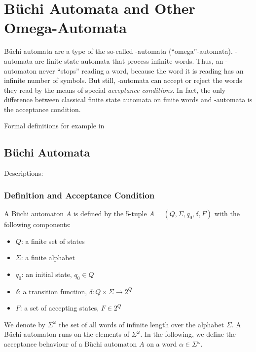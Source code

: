 


\section{Büchi Automata and Other Omega-Automata}
Büchi automata are a type of the so-called \om-automata (``omega''-automata). \om-automata are finite state automata that process infinite words. Thus, an \om-automaton never ``stops'' reading a word, because the word it is reading has an infinite number of symbols. But still, \om-automata can accept or reject the words they read by the means of special \textit{acceptance conditions}. In fact, the only difference between classical finite state automata on finite words and \om-automata is the acceptance condition. 


Formal definitions for example in~\cite{Thomas:1991}\cite{1996_thomas}\cite{2014_wilke}

\subsection{Büchi Automata}
\label{buchi_automata}


Descriptions: \cite{Thomas:1991}\cite{2014_wilke}

\subsubsection{Definition and Acceptance Condition}

A Büchi automaton $A$ is defined by the 5-tuple $A = (Q, \Sigma, q_0, \delta, F)$ with the following components:
\begin{itemize}
\item $Q$: a finite set of states
\item $\Sigma$: a finite alphabet
\item $q_0$: an initial state, $q_0 \in Q$
\item $\delta$: a transition function, $\delta: Q \times \Sigma \rightarrow 2^Q$
\item $F$: a set of accepting states, $F \in 2^Q$
\end{itemize}

We denote by $\Sigma^\omega$ the set of all words of infinite length over the alphabet $\Sigma$. A Büchi automaton runs on the elements of $\Sigma^\omega$. In the following, we define the acceptance behaviour of a Büchi automaton $A$ on a word $\alpha \in \Sigma^\omega$.

